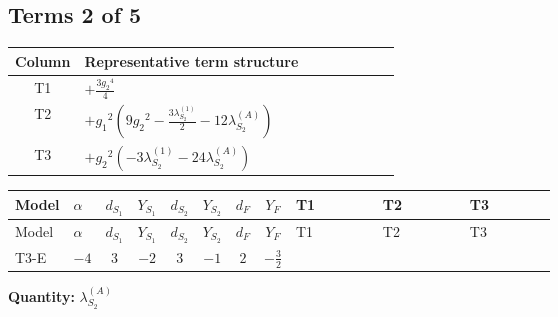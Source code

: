 \documentclass[8pt]{article}
\begin{document}
\begin{landscape}
\subsection*{Terms 2 of 5}
\begin{center}
\begin{tabular}{@{}c >{\raggedright\arraybackslash}p{0.82\linewidth}@{}}
\toprule
Column & Representative term structure \\
\midrule
T1 & \(\displaystyle +\frac{3 {g_2}^4}{4}\) \\
\midrule
T2 & \(\displaystyle +{g_1}^2 \left(9 {g_2}^2-\frac{3 {\lambda_{S_2}^{(1)}}}{2}-12 {\lambda_{S_2}^{(A)}}\right)\) \\
\midrule
T3 & \(\displaystyle +{g_2}^2 (-3 {\lambda_{S_2}^{(1)}}-24 {\lambda_{S_2}^{(A)}})\) \\
\midrule
\bottomrule
\end{tabular}
\end{center}
\smallskip
\tiny
\begin{longtable}{@{}llcccccc >{\raggedright\arraybackslash}p{0.21\linewidth} >{\raggedright\arraybackslash}p{0.21\linewidth} >{\raggedright\arraybackslash}p{0.21\linewidth}@{}}
\toprule
Model & $\alpha$ & $d_{S_1}$ & $Y_{S_1}$ & $d_{S_2}$ & $Y_{S_2}$ & $d_F$ & $Y_F$ & T1 & T2 & T3 \\
\midrule
\endfirsthead
\toprule
Model & $\alpha$ & $d_{S_1}$ & $Y_{S_1}$ & $d_{S_2}$ & $Y_{S_2}$ & $d_F$ & $Y_F$ & T1 & T2 & T3 \\
\midrule
\endhead
T3-E & $-4$ & $3$ & $-2$ & $3$ & $-1$ & $2$ & $-\frac{3}{2}$ & \scriptsize\adjustbox{max width=\linewidth}{$\begin{gathered} +\frac{3 {g_2}^4}{4}\end{gathered}$} & \scriptsize\adjustbox{max width=\linewidth}{$\begin{gathered} +{g_1}^2 \left(9 {g_2}^2-\frac{3 {\lambda_{S_2}^{(1)}}}{2}-12 {\lambda_{S_2}^{(A)}}\right)\end{gathered}$} & \scriptsize\adjustbox{max width=\linewidth}{$\begin{gathered} +{g_2}^2 (-3 {\lambda_{S_2}^{(1)}}-24 {\lambda_{S_2}^{(A)}})\end{gathered}$} \\
\midrule
\bottomrule
\end{longtable}
\clearpage
\noindent\textbf{Quantity: }$\lambda_{S_2}^{(A)}$\par\smallskip

\end{landscape}
\end{document}
